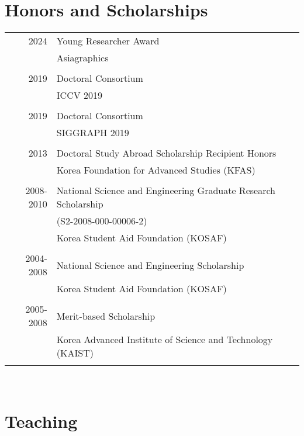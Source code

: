 \documentclass[letterpaper,10pt]{article} %
\newcommand{\blankline}{\quad\pagebreak[2]}
\begin{document}
{{\section{Honors and Scholarships}

\begin{tabular}{r|p{11cm}}
2024 & Young Researcher Award\\
& Asiagraphics\\
&\\
2019 & Doctoral Consortium\\
& ICCV 2019\\
&\\
2019 & Doctoral Consortium\\
& SIGGRAPH 2019\\
&\\
2013 & Doctoral Study Abroad Scholarship Recipient Honors\\
& Korea Foundation for Advanced Studies (KFAS)\\
&\\
2008-2010 & National Science and Engineering Graduate Research Scholarship\\
& (S2-2008-000-00006-2)\\
& Korea Student Aid Foundation (KOSAF)\\
&\\
2004-2008 & National Science and Engineering Scholarship \\
& Korea Student Aid Foundation (KOSAF)\\
&\\
2005-2008 & Merit-based Scholarship\\
& Korea Advanced Institute of Science and Technology (KAIST)\\
&\\
\end{tabular}\\

\blankline



\section{Teaching}

\begin{tabular}{r|p{11cm}}



\end{tabular}}}
\end{document}

